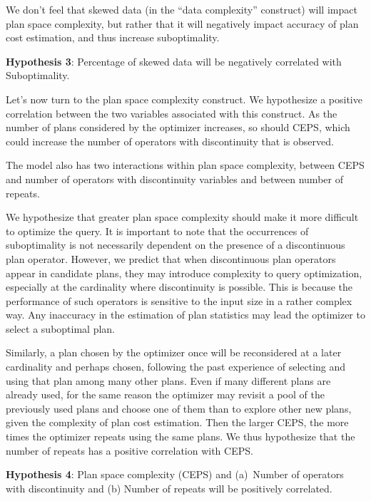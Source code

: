 \documentclass[prodmode,acmtods]{acmsmall}
\begin{document}
\vspace{0.6em}
We don't feel that skewed data (in the ``data complexity''
construct) will impact plan space
complexity, but rather that it will negatively impact accuracy of plan cost
estimation, and thus increase suboptimality.

\vspace{0.6em}\noindent
{\bf Hypothesis 3}: Percentage of skewed data will be negatively correlated with Suboptimality.

\vspace{0.6em}
Let's now turn to the plan space complexity construct. We hypothesize a positive
correlation between the two variables associated with this construct. As the
number of plans considered by the optimizer increases, so should CEPS, which
could increase the number of operators with discontinuity that is observed.

The model also has two interactions within plan space
complexity, between 
CEPS and number of operators with discontinuity variables and between number of repeats.

We hypothesize that greater plan space complexity should make it more
difficult to optimize the query.  It is important to note that the
occurrences of suboptimality is not necessarily dependent on the presence
of a discontinuous plan operator. However, we predict that when
discontinuous plan operators appear in candidate plans, they may introduce
complexity to query optimization, especially at the cardinality where
discontinuity is possible. This is because the performance of such operators
is sensitive to the input size in a rather complex way. Any inaccuracy in
the estimation of plan statistics may lead the optimizer to select a suboptimal
plan.

\vspace{0.6em}
Similarly, a plan chosen by the optimizer once will be reconsidered at a
later cardinality and perhaps chosen, following
the past experience of selecting and using that plan among many other plans.
Even if many different plans are already used, 
for the same reason the optimizer may revisit a pool of 
the previously used plans and choose one of them than to explore other new plans, 
given the complexity of plan cost estimation. 
Then the larger CEPS, the more times the optimizer repeats using the same plans. 
We thus hypothesize that the number of repeats has a positive correlation with CEPS. 

\vspace{0.6em}\noindent
{\bf Hypothesis 4}: Plan space complexity (CEPS) and (a)~Number of operators
with discontinuity and (b) Number of repeats will be positively correlated.
\end{document}
